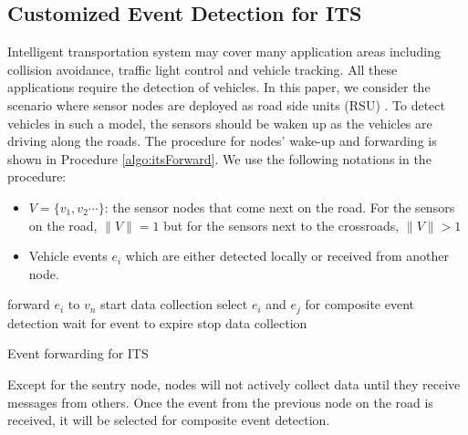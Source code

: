 \subsection{Customized Event Detection for ITS}
Intelligent transportation system may cover many application areas including collision avoidance, traffic light control and vehicle tracking. All these applications require the detection of vehicles. In this paper, we consider the scenario where sensor nodes are deployed as road side units (RSU) \cite{klein:its}. To detect vehicles in such a model, the sensors should be waken up as the vehicles are driving along the roads. The procedure for nodes' wake-up and forwarding is shown in Procedure \ref{algo:itsForward}. We use the following notations in the procedure:
\begin{itemize}
\item \(V=\{v_1, v_2 \cdots \}\): the sensor nodes that come next on the road. For the sensors on the road, \(\|V\|=1\) but for the sensors next to the crossroads, \(\|V\|>1\)
\item Vehicle events \(e_i\) which are either detected locally or received from another node.
\end{itemize}

\begin{algorithm}
\begin{algorithmic}[1]
			\STATE forward \(e_i\) to \(v_n\)
		\ENDFOR
	\ENDIF
		\STATE start data collection
			\STATE select \(e_i\) and \(e_j\) for composite event detection
		\ELSE
			\STATE wait for event to expire
		\ENDIF
		\STATE stop data collection
	\ENDIF
\end{algorithmic}
\caption{Event forwarding for ITS}
\label{algo:itsForward}
\end{algorithm}

Except for the sentry node, nodes will not actively collect data until they receive messages from others. Once the event from the previous node on the road is received, it will be selected for composite event detection.